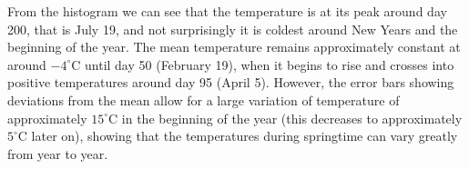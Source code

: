 \documentclass[a4paper,12pt,twoside]{article}
\begin{document}
 From the histogram we can see that the temperature is at its peak around day 200, that is July 19, and
 not surprisingly it is coldest around New Years and the beginning of the year. The mean temperature remains
 approximately constant at around $-4 ^{\circ}$C until day 50 (February 19), when it begins to rise and crosses into
 positive temperatures around day 95 (April 5). However, the error bars showing deviations from the mean allow for a large
 variation of temperature of approximately $15 ^{\circ}$C in the beginning of the year (this decreases to approximately $5 ^{\circ}$C
 later on), showing that the temperatures during springtime can vary greatly from year to year.
 
 
\end{document}
